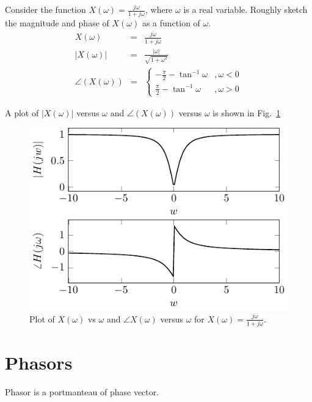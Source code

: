 \begin{example} Consider the function $X(\omega) = \frac{j \omega}{1+j\omega}$, where $\omega$ is a real variable.  Roughly sketch the magnitude and phase of $X(\omega)$ as a function of $\omega$.
\begin{eqnarray}
\nonumber X(\omega) &=& \frac{j\omega}{1+j\omega}\\
\nonumber |X(\omega)| &=& \frac{|\omega|}{\sqrt{1+\omega^2}}\\
\nonumber \angle(X(\omega)) &=& \left\{\begin{array}{ll}
-\frac{\pi}{2}-\tan^{-1}\omega &,\omega <0 \\
\frac{\pi}{2}-\tan^{-1}\omega &,\omega >0\end{array}
\right.
\end{eqnarray}

A plot of $|X(\omega)|$ versus $\omega$ and $\angle(X(\omega))$ versus $\omega$ is shown in Fig.~\ref{fig:Xomegaexample2}
\begin{figure}[htbp]
\begin{center}\includegraphics{../Images/ComplexNumbers/Fig_0_7.pdf}\end{center}
\caption{Plot of $X(\omega)$ vs $\omega$ and $\angle X(\omega)$ versus $\omega$ for $X(\omega) = \frac{j \omega}{1+j\omega}$.}
\label{fig:Xomegaexample2}
\end{figure}
\end{example}

\section{Phasors}
Phasor is a portmanteau of phase vector. 

